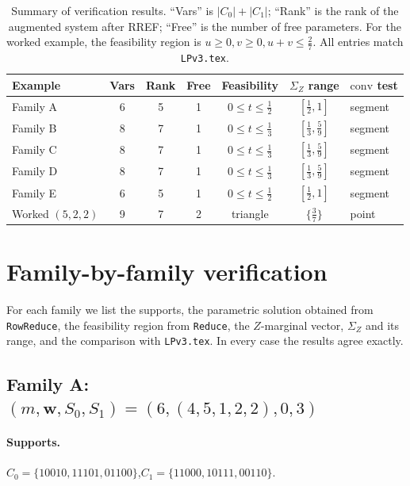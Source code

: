 \documentclass{article}
\newcommand{\SigZ}{\Sigma_Z}
\newcommand{\conv}{\mathrm{conv}}
\begin{document}
\begin{table}[ht]
\centering
\begin{tabular}{lcccccl}
\toprule
Example & Vars & Rank & Free & Feasibility & $\SigZ$ range & $\conv$ test \\
\midrule
Family A & 6 & 5 & 1 & $0\le t\le\tfrac12$ & $[\tfrac12,1]$ & segment \\
Family B & 8 & 7 & 1 & $0\le t\le\tfrac13$ & $[\tfrac13,\tfrac59]$ & segment \\
Family C & 8 & 7 & 1 & $0\le t\le\tfrac13$ & $[\tfrac13,\tfrac59]$ & segment \\
Family D & 8 & 7 & 1 & $0\le t\le\tfrac13$ & $[\tfrac13,\tfrac59]$ & segment \\
Family E & 6 & 5 & 1 & $0\le t\le\tfrac12$ & $[\tfrac12,1]$ & segment \\
Worked $(5,2,2)$ & 9 & 7 & 2 & triangle & $\{\tfrac37\}$ & point \\
\bottomrule
\end{tabular}
\caption{Summary of verification results. ``Vars'' is $|C_0|+|C_1|$; ``Rank'' is the rank of the augmented system after RREF; ``Free'' is the number of free parameters. For the worked example, the feasibility region is $u\ge0, v\ge0, u+v\le\tfrac{2}{7}$. All entries match \texttt{LPv3.tex}.}
\label{tab:summary}
\end{table}

\section{Family-by-family verification}
\label{sec:families}

For each family we list the supports, the parametric solution obtained from \texttt{RowReduce}, the feasibility region from \texttt{Reduce}, the $Z$-marginal vector, $\SigZ$ and its range, and the comparison with \texttt{LPv3.tex}.
In every case the results agree exactly.

\subsection{Family A: $(m,\mathbf{w},S_0,S_1)=(6,(4,5,1,2,2),0,3)$}

\paragraph{Supports.}
$C_0=\{10010, 11101, 01100\}$,\quad $C_1=\{11000, 10111, 00110\}$.
\end{document}
